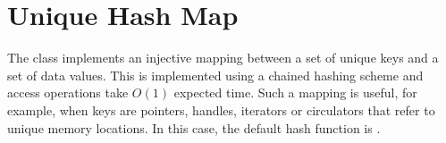 
\section{Unique Hash Map}

The class  implements an injective mapping between
a set of unique keys and a set of data values.  This is implemented using
a chained hashing scheme and access operations take $O(1)$ expected time.
Such a mapping is useful, for example, when keys are pointers, 
handles, iterators or circulators that refer to unique memory locations.
In this case, the default hash function is .

